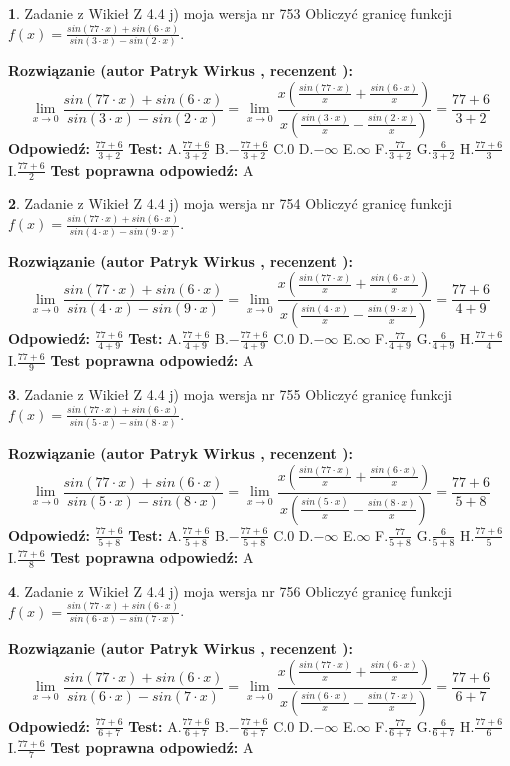 \documentclass[12pt, a4paper]{article}
\theoremstyle{definition} %
\newtheorem{zad}{}
\newcommand{\zadStart}[1]{\begin{zad}#1\newline}
\newcommand{\zadStop}{\end{zad}}
\newcommand{\rozwStart}[2]{\noindent \textbf{Rozwiązanie (autor #1 , recenzent #2): }\newline}
\newcommand{\rozwStop}{\newline}
\newcommand{\odpStart}{\noindent \textbf{Odpowiedź:}\newline}
\newcommand{\odpStop}{\newline}
\newcommand{\testStart}{\noindent \textbf{Test:}\newline}
\newcommand{\testStop}{\newline}
\newcommand{\kluczStart}{\noindent \textbf{Test poprawna odpowiedź:}\newline}
\newcommand{\kluczStop}{\newline}
\begin{document}
\zadStart{Zadanie z Wikieł Z 4.4 j) moja wersja nr 753}
Obliczyć granicę funkcji $f(x)=\frac{sin(77\cdot x) +sin(6\cdot x)}{sin(3\cdot x) -sin(2\cdot x)}$.
\zadStop
\rozwStart{Patryk Wirkus}{}
$$\lim\limits_{x\to 0}\frac{sin(77\cdot x) +sin(6\cdot x)}{sin(3\cdot x) -sin(2\cdot x)}=\lim\limits_{x\to 0}\frac{x(\frac{sin(77\cdot x)}{x}+\frac{sin(6\cdot x)}{x})}{x(\frac{sin(3\cdot x)}{x}-\frac{sin(2\cdot x)}{x})}=\frac{77+6}{3+2}$$
\rozwStop
\odpStart
$\frac{77+6}{3+2}$
\odpStop
\testStart
A.$\frac{77+6}{3+2}$
B.$-\frac{77+6}{3+2}$
C.$0$
D.$-\infty$
E.$\infty$
F.$\frac{77}{3+2}$
G.$\frac{6}{3+2}$
H.$\frac{77+6}{3}$
I.$\frac{77+6}{2}$
\testStop
\kluczStart
A
\kluczStop



\zadStart{Zadanie z Wikieł Z 4.4 j) moja wersja nr 754}
Obliczyć granicę funkcji $f(x)=\frac{sin(77\cdot x) +sin(6\cdot x)}{sin(4\cdot x) -sin(9\cdot x)}$.
\zadStop
\rozwStart{Patryk Wirkus}{}
$$\lim\limits_{x\to 0}\frac{sin(77\cdot x) +sin(6\cdot x)}{sin(4\cdot x) -sin(9\cdot x)}=\lim\limits_{x\to 0}\frac{x(\frac{sin(77\cdot x)}{x}+\frac{sin(6\cdot x)}{x})}{x(\frac{sin(4\cdot x)}{x}-\frac{sin(9\cdot x)}{x})}=\frac{77+6}{4+9}$$
\rozwStop
\odpStart
$\frac{77+6}{4+9}$
\odpStop
\testStart
A.$\frac{77+6}{4+9}$
B.$-\frac{77+6}{4+9}$
C.$0$
D.$-\infty$
E.$\infty$
F.$\frac{77}{4+9}$
G.$\frac{6}{4+9}$
H.$\frac{77+6}{4}$
I.$\frac{77+6}{9}$
\testStop
\kluczStart
A
\kluczStop



\zadStart{Zadanie z Wikieł Z 4.4 j) moja wersja nr 755}
Obliczyć granicę funkcji $f(x)=\frac{sin(77\cdot x) +sin(6\cdot x)}{sin(5\cdot x) -sin(8\cdot x)}$.
\zadStop
\rozwStart{Patryk Wirkus}{}
$$\lim\limits_{x\to 0}\frac{sin(77\cdot x) +sin(6\cdot x)}{sin(5\cdot x) -sin(8\cdot x)}=\lim\limits_{x\to 0}\frac{x(\frac{sin(77\cdot x)}{x}+\frac{sin(6\cdot x)}{x})}{x(\frac{sin(5\cdot x)}{x}-\frac{sin(8\cdot x)}{x})}=\frac{77+6}{5+8}$$
\rozwStop
\odpStart
$\frac{77+6}{5+8}$
\odpStop
\testStart
A.$\frac{77+6}{5+8}$
B.$-\frac{77+6}{5+8}$
C.$0$
D.$-\infty$
E.$\infty$
F.$\frac{77}{5+8}$
G.$\frac{6}{5+8}$
H.$\frac{77+6}{5}$
I.$\frac{77+6}{8}$
\testStop
\kluczStart
A
\kluczStop



\zadStart{Zadanie z Wikieł Z 4.4 j) moja wersja nr 756}
Obliczyć granicę funkcji $f(x)=\frac{sin(77\cdot x) +sin(6\cdot x)}{sin(6\cdot x) -sin(7\cdot x)}$.
\zadStop
\rozwStart{Patryk Wirkus}{}
$$\lim\limits_{x\to 0}\frac{sin(77\cdot x) +sin(6\cdot x)}{sin(6\cdot x) -sin(7\cdot x)}=\lim\limits_{x\to 0}\frac{x(\frac{sin(77\cdot x)}{x}+\frac{sin(6\cdot x)}{x})}{x(\frac{sin(6\cdot x)}{x}-\frac{sin(7\cdot x)}{x})}=\frac{77+6}{6+7}$$
\rozwStop
\odpStart
$\frac{77+6}{6+7}$
\odpStop
\testStart
A.$\frac{77+6}{6+7}$
B.$-\frac{77+6}{6+7}$
C.$0$
D.$-\infty$
E.$\infty$
F.$\frac{77}{6+7}$
G.$\frac{6}{6+7}$
H.$\frac{77+6}{6}$
I.$\frac{77+6}{7}$
\testStop
\kluczStart
A
\kluczStop
\end{document}

